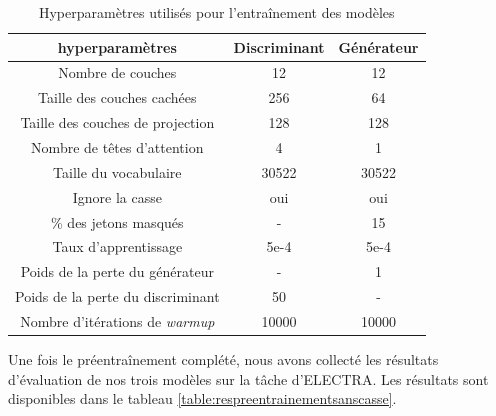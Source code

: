 \documentclass[12pt,twoside,rapport]{dms}
\theoremstyle{definition}
\numberwithin{equation}{section}
\numberwithin{table}{chapter}
\numberwithin{figure}{chapter}
\begin{document}
\begin{table}[h!]
	\centering
	\begin{tabular}{||c | c c||}
		\hline
		hyperparamètres                        & Discriminant & Générateur \\ [0.5ex]
		\hline\hline
		Nombre de couches                      & 12           & 12         \\
		Taille des couches cachées             & 256          & 64         \\
		Taille des couches de projection       & 128          & 128        \\
		Nombre de têtes d'attention            & 4            & 1          \\
		Taille du vocabulaire                  & 30522        & 30522      \\
		Ignore la casse                        & oui          & oui        \\
		\% des jetons masqués                  & -            & 15         \\
		Taux d'apprentissage                   & 5e-4         & 5e-4       \\
		Poids de la perte du générateur        & -            & 1          \\
		Poids de la perte du discriminant      & 50           & -          \\
		Nombre d'itérations de \textit{warmup} & 10000        & 10000      \\
		\hline
	\end{tabular}
	\caption{Hyperparamètres utilisés pour l'entraînement des modèles}
	\label{table:pre-entr-hp}
\end{table}

Une fois le préentraînement complété, nous avons collecté les résultats
d'évaluation de nos trois modèles sur la tâche d'ELECTRA. Les résultats sont
disponibles dans le tableau \ref{table:respreentrainementsanscasse}. \\
\end{document}
